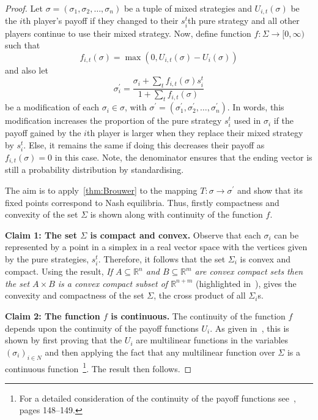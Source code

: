 \begin{proof}
    Let \(\sigma = (\sigma_{1}, \sigma_{2}, \ldots, \sigma_{n})\) be a tuple of
    mixed strategies and \(U_{i,t}(\sigma)\) be the \(i\)th player's payoff if
    they changed to their \(s_{i}^{t}\)th pure strategy and all other players
    continue to use their mixed strategy.
    Now, define function \(f: \Sigma \to [0, \infty)\) such that 
    \begin{equation}
        f_{i,t}(\sigma) = \max{(0, U_{i,t}(\sigma)-U_{i}(\sigma))}
    \end{equation}
    and also let 
    \begin{equation}
        \sigma_{i}^{\prime} = \frac{ \sigma_{i}+\sum_{t}{f_{i,t}(\sigma)s_{i}^{t}} }{ 1+\sum_{t}{f_{i,t}(\sigma)} }
    \end{equation}
    be a modification of each \(\sigma_{i} \in \sigma \), with \(\sigma^{\prime}
    = (\sigma_{1}^{\prime}, \sigma_{2}^{\prime}, \ldots, \sigma_{n}^{\prime})\).
    In words, this modification increases the proportion of the pure strategy
    \(s_{i}^{t}\) used in \(\sigma_{i}\) if the payoff gained by the \(i\)th player is
    larger when they replace their mixed strategy by \(s_{i}^{t}\). Else, it remains the
    same if doing this decreases their payoff as \(f_{i,t}(\sigma)=0\) in this
    case. Note, the denominator ensures that the ending vector is still a
    probability distribution by standardising.

    The aim is to apply~\autoref{thm:Brouwer} to the mapping \(T: \sigma \to
    \sigma^{\prime}\) and show that its fixed points correspond to Nash
    equilibria. Thus, firstly compactness and convexity of the set \(\Sigma \)
    is shown along with continuity of the function \(f\). 
    
    \textbf{Claim 1: The set \(\Sigma \) is compact and convex.}
    Observe that each \(\sigma_{i}\) can be represented by a point in a simplex
    in a real vector space with the vertices given by the pure strategies,
    \(s_{i}^{t}\). Therefore, it follows that the set \(\Sigma_{i}\) is convex
    and compact. Using the result, \textit{If \(A \subseteq \mathbb{R}^{n}\) and
    \(B \subseteq \mathbb{R}^{m}\) are convex compact sets then the set \(A
    \times B\) is a convex compact subset of \(\mathbb{R}^{n+m}\)} (highlighted in~\cite{maschler_solan_zamir_2013}), gives the convexity and
    compactness of the set \(\Sigma \), the cross product of all
    \(\Sigma_{i}\)s. 
    
    \textbf{Claim 2: The function \(f\) is continuous.}
    The continuity of the function \(f\) depends upon the continuity of the
    payoff functions \(U_{i}\). As given in~\cite{maschler_solan_zamir_2013},
    this is shown by first proving that the \(U_{i}\) are multilinear functions
    in the variables \({(\sigma_{i})}_{i \in N}\) and then applying the fact
    that any multilinear function over \(\Sigma \) is a continuous
    function~\footnote{For a detailed consideration of the continuity of the
    payoff functions see~\cite{maschler_solan_zamir_2013}, pages
    148--149.}. The result then follows.


\end{proof}
